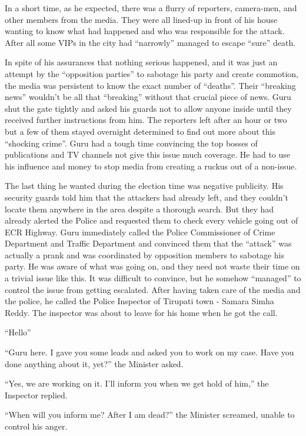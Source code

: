 In a short time, as he expected, there was a flurry of reporters, camera-men,
and other members from the media. They were all lined-up in front of his house
wanting to know what had happened and who was responsible for the attack. After
all some VIPs in the city had “narrowly” managed to escape “sure” death.

In spite of his assurances that nothing serious happened, and it was just an
attempt by the “opposition parties” to sabotage his party and create commotion,
the media was persistent to know the exact number of “deaths”. Their “breaking
news” wouldn't be all that “breaking” without that crucial piece of news. Guru
shut the gate tightly and asked his guards not to allow anyone inside until they
received further instructions from him. The reporters left after an hour or two
but a few of them stayed overnight determined to find out more about this
“shocking crime”. Guru had a tough time convincing the top bosses of
publications and TV channels not give this issue much coverage. He had to use
his influence and money to stop media from creating a ruckus out of a non-issue.

The last thing he wanted during the election time was negative publicity. His
security guards told him that the attackers had already left, and they couldn't
locate them anywhere in the area despite a thorough search. But they had already
alerted the Police and requested them to check every vehicle going out of ECR
Highway. Guru immediately called the Police Commissioner of Crime Department and
Traffic Department and convinced them that the “attack” was actually a prank and
was coordinated by opposition members to sabotage his party. He was aware of
what was going on, and they need not waste their time on a trivial issue like
this. It was difficult to convince, but he somehow “managed” to control the
issue from getting escalated.
After having taken care of the media and the police, he called the Police
Inspector of Tirupati town - Samara Simha Reddy. The inspector was about to
leave for his home when he got the call.

“Hello”

“Guru here. I gave you some leads and asked you to work on my case. Have you
done anything about it, yet?” the Minister asked.

“Yes, we are working on it. I'll inform you when we get hold of him,” the
Inspector replied.

“When will you inform me? After I am dead?” the Minister screamed, unable to
control his anger.

